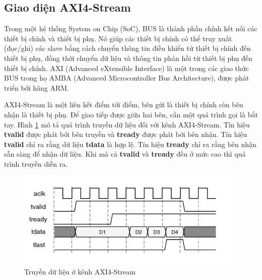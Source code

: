 \subsection{Giao diện AXI4-Stream}
Trong một hệ thống System on Chip (SoC), BUS là thành phần chính kết nối các thiết bị chính và thiết bị phụ. Nó giúp các thiết bị chính có thể truy xuất (đọc/ghi) các slave bằng cách chuyển thông tin điều khiển từ thiết bị chính đến thiết bị phụ, đồng thời chuyển dữ liệu và thông tin phản hồi từ thiết bị phụ đến thiết bị chính. AXI (Advanced eXtensible Interface) là một trong các giao thức BUS trong họ AMBA (Advanced Microcontroller Bus Architecture), được phát triển bởi hãng ARM. 

AXI4-Stream là một liên kết điểm tới điểm, bên gửi là thiết bị chính còn bên nhận là thiết bị phụ. Để giao tiếp được giữa hai bên, cần một quá trình gọi là bắt tay. Hình \ref{fig:axi4} mô tả quá trình truyền dữ liệu đối với kênh AXI4-Stream. Tín hiệu \textbf{tvalid} được phát bởi bên truyền và \textbf{tready} được phát bởi bên nhận. Tín hiệu \textbf{tvalid} chỉ ra rằng dữ liệu \textbf{tdata} là hợp lệ. Tín hiệu \textbf{tready} chỉ ra rằng bên nhận sẵn sàng để nhận dữ liệu. Khi mà cả \textbf{tvalid} và \textbf{tready} đều ở mức cao thì quá trình truyền diễn ra.


\begin{figure}[!ht]
    \centering
    \includegraphics[width=\linewidth]{figures/axi4.png}
    \caption{Truyền dữ liệu ở kênh AXI4-Stream}
    \label{fig:axi4}
\end{figure}
